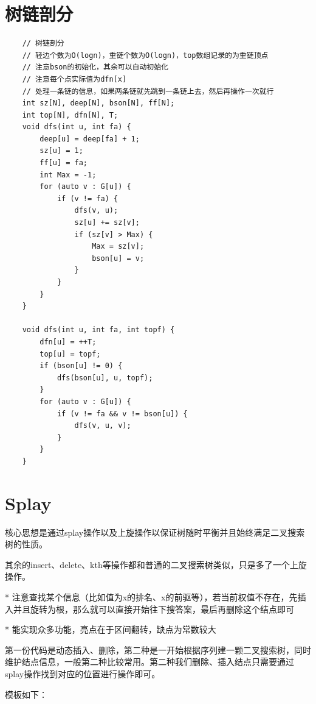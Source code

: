 \documentclass[a4paper,11pt,twoside,fontset = fandol,UTF8]{ctexbook} %
\begin{document}
	\section{树链剖分}
	\begin{lstlisting}
	// 树链剖分
	// 轻边个数为O(logn)，重链个数为O(logn)，top数组记录的为重链顶点 
	// 注意bson的初始化，其余可以自动初始化
	// 注意每个点实际值为dfn[x]
	// 处理一条链的信息，如果两条链就先跳到一条链上去，然后再操作一次就行 
	int sz[N], deep[N], bson[N], ff[N];
	int top[N], dfn[N], T;
	void dfs(int u, int fa) {
	    deep[u] = deep[fa] + 1;
	    sz[u] = 1;
	    ff[u] = fa;
	    int Max = -1;
	    for (auto v : G[u]) {
	        if (v != fa) {
	            dfs(v, u);
	            sz[u] += sz[v];
	            if (sz[v] > Max) {
	                Max = sz[v];
	                bson[u] = v;
	            }
	        }
	    }
	}
	
	void dfs(int u, int fa, int topf) {
	    dfn[u] = ++T;
	    top[u] = topf;
	    if (bson[u] != 0) {
	        dfs(bson[u], u, topf);
	    }
	    for (auto v : G[u]) {
	        if (v != fa && v != bson[u]) {
	            dfs(v, u, v);
	        }
	    }
	} 
	\end{lstlisting}
	
	\section{Splay}
	核心思想是通过splay操作以及上旋操作以保证树随时平衡并且始终满足二叉搜索树的性质。
	
	其余的insert、delete、kth等操作都和普通的二叉搜索树类似，只是多了一个上旋操作。
	
	* 注意查找某个信息（比如值为x的排名、x的前驱等），若当前权值不存在，先插入并且旋转为根，那么就可以直接开始往下搜答案，最后再删除这个结点即可
	
	* 能实现众多功能，亮点在于区间翻转，缺点为常数较大
	
	
	第一份代码是动态插入、删除，第二种是一开始根据序列建一颗二叉搜索树，同时维护结点信息，一般第二种比较常用。第二种我们删除、插入结点只需要通过splay操作找到对应的位置进行操作即可。
	
	模板如下：
	
\end{document}
